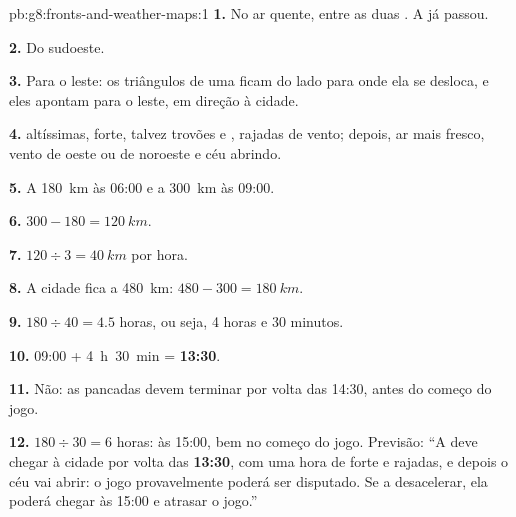 \begin{solution}{pb:g8:fronts-and-weather-maps:1}
\textbf{1.} No ar quente, entre as duas . A  já
passou.

\textbf{2.} Do sudoeste.

\textbf{3.} Para o leste: os triângulos de uma  ficam do lado
para onde ela se desloca, e eles apontam para o leste, em direção à cidade.

\textbf{4.}  altíssimas,  forte, talvez trovões e ,
rajadas de vento; depois, ar mais fresco, vento de oeste ou de noroeste e
céu abrindo.

\textbf{5.} A \qty{180}{km} às 06:00 e a \qty{300}{km} às 09:00.

\textbf{6.} $300 - 180 = \qty{120}{km}$.

\textbf{7.} $120 \div 3 = \qty{40}{km}$ por hora.

\textbf{8.} A cidade fica a \qty{480}{km}: $480 - 300 = \qty{180}{km}$.

\textbf{9.} $180 \div 40 = 4.5$ horas, ou seja, 4 horas e 30 minutos.

\textbf{10.} 09:00 + 4~h~30~min = \textbf{13:30}.

\textbf{11.} Não: as pancadas devem terminar por volta das 14:30, antes do
começo do jogo.

\textbf{12.} $180 \div 30 = 6$ horas: às 15:00, bem no começo do jogo.
Previsão: ``A  deve chegar à cidade por volta das
\textbf{13:30}, com uma hora de  forte e rajadas, e depois o céu vai
abrir: o jogo provavelmente poderá ser disputado. Se a  desacelerar,
ela poderá chegar às 15:00 e atrasar o jogo.''
\end{solution}
